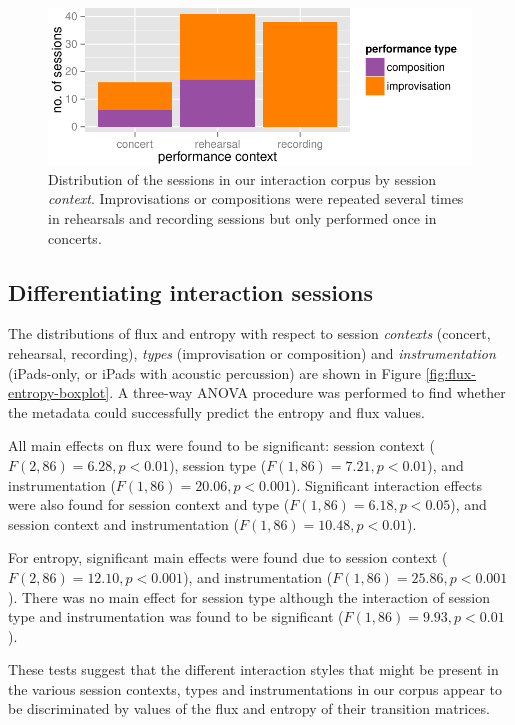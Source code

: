 \documentclass{sigchi}
\begin{document}
\begin{figure}
  \centering
  \includegraphics[width=\linewidth]{figures/sessions-count}
  \caption{Distribution of the sessions in our interaction corpus by
    session {\em context}. Improvisations or compositions were repeated
    several times in rehearsals and recording sessions but only performed
    once in concerts.
    \label{fig:count-data}}
\end{figure}

\subsection{Differentiating interaction sessions}
\label{differentiating-interaction-sessions}

The distributions of flux and entropy with respect to session {\em contexts} (concert,
rehearsal, recording),
{\em types} (improvisation or composition) and {\em instrumentation} (iPads-only, or iPads with acoustic
percussion) are shown in Figure
\ref{fig:flux-entropy-boxplot}. A three-way ANOVA procedure was
performed to find whether the metadata could 
successfully predict the entropy and flux values.

All main effects on flux were found to be significant: session
context ($F(2,86) = 6.28, p < 0.01$), session type
($F(1,86) = 7.21, p < 0.01$), and instrumentation
($F(1,86) = 20.06, p < 0.001$). Significant interaction effects were
also found for session context and type
($F(1,86) = 6.18, p < 0.05$), and session context and
instrumentation ($F(1,86) = 10.48, p < 0.01$).

For entropy, significant main effects were found due to session
context ($F(2,86) = 12.10, p < 0.001$), and instrumentation
($F(1,86) = 25.86, p < 0.001$).
There was no main effect for session type although
 the interaction of session type and
instrumentation was found to be significant
($F(1,86) = 9.93, p<0.01$).

These tests suggest that the different interaction styles that might be
present in the various session contexts, types and instrumentations in our corpus
appear to be discriminated  by values of the flux and entropy of their transition
matrices.
\end{document}
